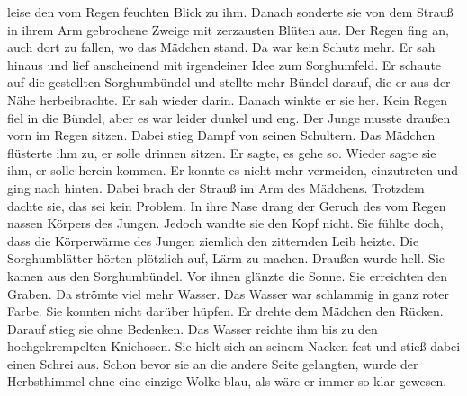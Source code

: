 \documentclass[prd,12pt,tightenlines,notitlepage,nofootinbib]{revtex4-1}
\begin{document}
leise den vom Regen feuchten Blick zu ihm.  Danach sonderte sie von dem
Strauß in ihrem Arm gebrochene Zweige mit zerzausten Blüten aus.
Der Regen fing an, auch dort zu fallen, wo das Mädchen stand.  Da war kein Schutz
mehr.  Er sah hinaus und lief anscheinend mit irgendeiner Idee zum
Sorghumfeld.  Er schaute auf die gestellten Sorghumbündel und stellte mehr
Bündel darauf, die er aus der Nähe herbeibrachte.  Er sah wieder darin.
Danach winkte er sie her.  Kein Regen fiel in die Bündel, aber es war
leider dunkel und eng.  Der Junge musste draußen vorn im Regen
sitzen.  Dabei stieg Dampf von seinen Schultern.  Das Mädchen
flüsterte ihm zu, er solle drinnen sitzen.  Er sagte, es gehe so.  Wieder
sagte sie ihm, er solle herein kommen.  Er konnte es nicht mehr vermeiden,
einzutreten und ging nach hinten.
Dabei brach der Strauß im Arm des
Mädchens.  Trotzdem dachte sie, das sei kein Problem.  In ihre Nase drang
der Geruch des vom Regen nassen Körpers des Jungen.  Jedoch wandte
sie den Kopf nicht.  Sie fühlte doch, dass die Körperwärme des Jungen
ziemlich den zitternden Leib heizte.  Die Sorghumblätter hörten
plötzlich auf, Lärm zu machen.  Draußen wurde hell.  Sie kamen aus
den Sorghumbündel.  Vor ihnen glänzte die Sonne.  Sie
erreichten den Graben.  Da strömte viel mehr Wasser.  Das Wasser war
schlammig in ganz roter Farbe.  Sie konnten nicht darüber hüpfen.  Er
drehte dem Mädchen den Rücken.  Darauf stieg sie ohne Bedenken.  Das
Wasser reichte ihm bis zu den hochgekrempelten Kniehosen.  Sie hielt
sich an seinem Nacken fest und stieß dabei einen Schrei aus.  Schon
bevor sie an die andere Seite gelangten, wurde der Herbsthimmel ohne
eine einzige Wolke blau, als wäre er immer so klar gewesen.
\end{document}
